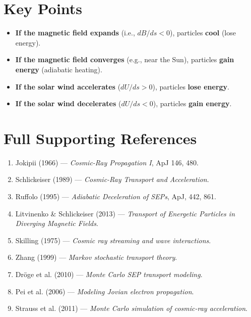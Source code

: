 \hrulefill

\section*{\texorpdfstring{ \textbf{Key Points}}{}}

\begin{itemize}
    \item \textbf{If the magnetic field expands} (i.e., $dB/ds < 0$), particles \textbf{cool} (lose energy).
    \item \textbf{If the magnetic field converges} (e.g., near the Sun), particles \textbf{gain energy} (adiabatic heating).
    \item \textbf{If the solar wind accelerates} ($dU/ds > 0$), particles \textbf{lose energy}.
    \item \textbf{If the solar wind decelerates} ($dU/ds < 0$), particles \textbf{gain energy}.
\end{itemize}

\hrulefill

\section*{\texorpdfstring{ \textbf{Full Supporting References}}{}}

\begin{enumerate}
    \item Jokipii (1966) --- \textit{Cosmic-Ray Propagation I}, ApJ 146, 480.
    \item Schlickeiser (1989) --- \textit{Cosmic-Ray Transport and Acceleration}.
    \item Ruffolo (1995) --- \textit{Adiabatic Deceleration of SEPs}, ApJ, 442, 861.
    \item Litvinenko \& Schlickeiser (2013) --- \textit{Transport of Energetic Particles in Diverging Magnetic Fields}.
    \item Skilling (1975) --- \textit{Cosmic ray streaming and wave interactions}.
    \item Zhang (1999) --- \textit{Markov stochastic transport theory}.
    \item Dröge et al. (2010) --- \textit{Monte Carlo SEP transport modeling}.
    \item Pei et al. (2006) --- \textit{Modeling Jovian electron propagation}.
    \item Strauss et al. (2011) --- \textit{Monte Carlo simulation of cosmic-ray acceleration}.
\end{enumerate}

